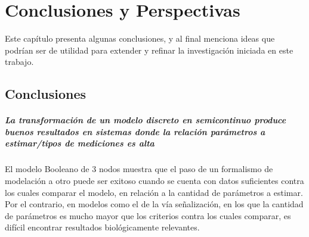 \chapter{Conclusiones y Perspectivas}\label{ch:conclusiones}


Este capítulo presenta algunas conclusiones, y al final menciona ideas que podrían ser de utilidad para extender y refinar la investigación iniciada en este trabajo. 

\section{Conclusiones}


\paragraph {La transformación de un modelo discreto en semicontinuo produce buenos resultados en sistemas donde la relación \emph{parámetros a estimar}/\emph{tipos de mediciones} es alta}El modelo Booleano de 3 nodos muestra que el paso de un formalismo de modelación a otro puede ser exitoso cuando se cuenta con datos suficientes contra los cuales comparar el modelo, en relación a la cantidad de parámetros a estimar. Por el contrario, en modelos como el de la vía señalización, en los que la cantidad de parámetros es mucho mayor que los criterios contra los cuales comparar, es difícil encontrar resultados biológicamente relevantes.

